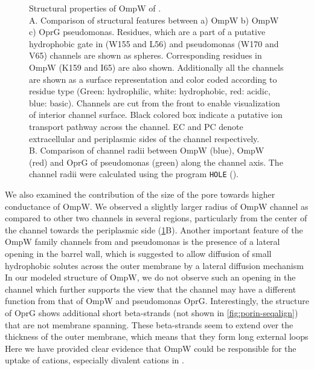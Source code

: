 \begin{figure}[htb]
  	\begin{center}
   	\end{center}
   	\caption[Structural properties of OmpW of \caulobacter]{Structural properties of OmpW of \caulobacter.\\
      A. Comparison of structural features between a) OmpW \caulobacter b) OmpW \ecoli c) OprG \ac{pseudomonas}. Residues, which are a part of a putative hydrophobic gate in \ecoli (W155 and L56) and \ac{pseudomonas} (W170 and V65) channels are shown as spheres. Corresponding residues in OmpW \caulobacter (K159 and I65) are also shown. Additionally all the channels are shown as a surface representation and color coded according to residue type (Green: hydrophilic, white: hydrophobic, red: acidic, blue: basic). Channels are cut from the front to enable visualization of interior channel surface. Black colored box indicate a putative ion transport pathway across the channel. EC and PC denote extracellular and periplasmic sides of the channel respectively. \\
B. Comparison of channel radii between \caulobacter OmpW (blue), \ecoli OmpW (red) and OprG of \ac{pseudomonas} (green) along the channel axis. The channel radii were calculated using the program \texttt{HOLE} ().
   	}
   	\label{fig:porin-models}
\end{figure}   

We also examined the contribution of the size of the pore towards higher conductance of \caulobacter OmpW. We observed a slightly larger radius of \caulobacter OmpW channel as compared to other two channels in several regions, particularly from the center of the channel towards the periplasmic side (\cref{fig:porin-models}B). Another important feature of the OmpW family channels from \ecoli and \ac{pseudomonas} is the presence of a lateral opening in the barrel wall, which is suggested to allow diffusion of small hydrophobic solutes across the outer membrane by a lateral diffusion mechanism In our modeled structure of \caulobacter OmpW, we do not observe such an opening in the channel which further supports the view that the \caulobacter channel may have a different function from that of \ecoli OmpW and \ac{pseudomonas} OprG. Interestingly, the structure of OprG shows additional short beta-strands (not shown in \cref{fig:porin-seqalign}) that are not membrane spanning. These beta-strands seem to extend over the thickness of the outer membrane, which means that they form long external loops Here we have provided clear evidence that OmpW could be responsible for the uptake of cations, especially divalent cations in \caulobacter. 

